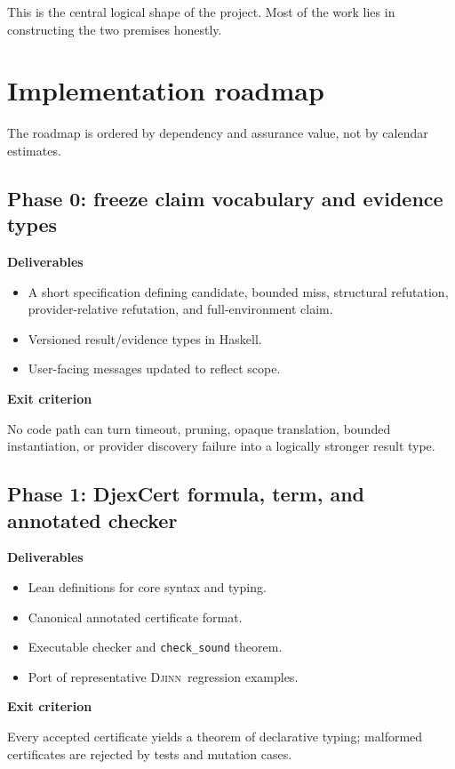 \documentclass[11pt,letterpaper,openany]{report}
\theoremstyle{definition}
\theoremstyle{remark}
\newcommand{\Djinn}{\textsc{Djinn}}
\newcommand{\code}[1]{\texttt{#1}}
\begin{document}
This is the central logical shape of the project. Most of the work lies in constructing the two premises honestly.

\chapter{Implementation roadmap}
\label{ch:roadmap}

The roadmap is ordered by dependency and assurance value, not by calendar estimates.

\section{Phase 0: freeze claim vocabulary and evidence types}

\textbf{Deliverables}
\begin{itemize}
\item A short specification defining candidate, bounded miss, structural refutation, provider-relative refutation, and full-environment claim.
\item Versioned result/evidence types in Haskell.
\item User-facing messages updated to reflect scope.
\end{itemize}

\textbf{Exit criterion}

No code path can turn timeout, pruning, opaque translation, bounded instantiation, or provider discovery failure into a logically stronger result type.

\section{Phase 1: DjexCert formula, term, and annotated checker}

\textbf{Deliverables}
\begin{itemize}
\item Lean definitions for core syntax and typing.
\item Canonical annotated certificate format.
\item Executable checker and \code{check\_sound} theorem.
\item Port of representative \Djinn\ regression examples.
\end{itemize}

\textbf{Exit criterion}

Every accepted certificate yields a theorem of declarative typing; malformed certificates are rejected by tests and mutation cases.
\end{document}
